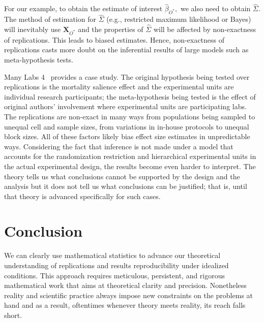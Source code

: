 \documentclass[meta,authordate,issue]{jote-new-article}
\newcommand{\X}{\mathbf{X}}
\newcounter{result}
\begin{document}
For our example, to obtain the estimate of interest $\hat{\beta}_{O^*},$ we also need to obtain
$\widehat{\Sigma}.$ The method of estimation for $\widehat{\Sigma}$ (e.g., restricted maximum likelihood or Bayes) will inevitably use $\X_{O^*}$ and the properties of $\widehat{\Sigma}$ will be affected by non-exactness of replications. This leads to biased estimates. Hence, non-exactness of replications casts more doubt on the inferential results of large models such as meta-hypothesis tests.

Many Labs 4~\parencite{klein2022many} provides a case study. The original hypothesis being tested over replications is the mortality salience effect and the experimental units are individual research participants; the meta-hypothesis being tested is the effect of original authors' involvement where experimental units are participating labs. The replications are non-exact in many ways from populations being sampled to unequal cell and sample sizes, from variations in in-house protocols to unequal block sizes. All of these factors likely bias effect size estimates in unpredictable ways. Considering the fact that inference is not made under a model that accounts for the randomization restriction and hierarchical experimental units in the actual experimental design, the results become even harder to interpret. The theory tells us what conclusions cannot be supported by the design and the analysis but it does not tell us what conclusions can be justified; that is, until that theory is advanced specifically for such cases.

\section{Conclusion}

We can clearly use mathematical statistics to advance our theoretical understanding of replications and results reproducibility under idealized conditions. This approach requires meticulous, persistent, and rigorous mathematical work that aims at theoretical clarity and precision. Nonetheless reality and scientific practice always impose new constraints on the problems at hand and as a result, oftentimes whenever theory meets reality, its reach falls short.
\end{document}
